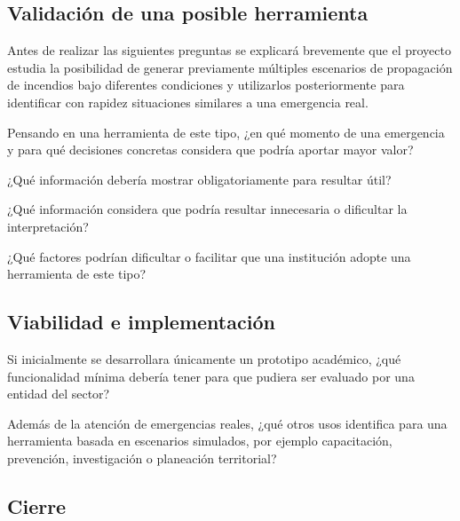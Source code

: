 \subsection{Validación de una posible herramienta}

Antes de realizar las siguientes preguntas se explicará brevemente que el proyecto
estudia la posibilidad de generar previamente múltiples escenarios de propagación
de incendios bajo diferentes condiciones y utilizarlos posteriormente para
identificar con rapidez situaciones similares a una emergencia real.

\begin{enumerate}
  \pregunta Pensando en una herramienta de este tipo, ¿en qué momento de una emergencia y para qué decisiones concretas considera que podría aportar mayor valor?

  \pregunta ¿Qué información debería mostrar obligatoriamente para resultar útil?

  \pregunta ¿Qué información considera que podría resultar innecesaria o dificultar la interpretación?

  \pregunta ¿Qué factores podrían dificultar o facilitar que una institución adopte una herramienta de este tipo?
\end{enumerate}


\subsection{Viabilidad e implementación}

\begin{enumerate}
  \pregunta Si inicialmente se desarrollara únicamente un prototipo académico, ¿qué funcionalidad mínima debería tener para que pudiera ser evaluado por una entidad del sector?





  \pregunta Además de la atención de emergencias reales, ¿qué otros usos identifica para una herramienta basada en escenarios simulados, por ejemplo capacitación, prevención, investigación o planeación territorial?
\end{enumerate}


\subsection{Cierre}

